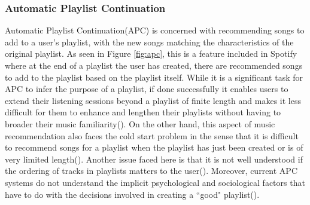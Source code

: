 \documentclass{l4proj}
\begin{document}
\subsubsection{Automatic Playlist Continuation} Automatic Playlist Continuation(APC) is concerned with recommending songs to add to a user's playlist, with the new songs matching the characteristics of the original playlist. As seen in Figure \ref{fig:apc}, this is a feature included in Spotify where at the end of a playlist the user has created, there are recommended songs to add to the playlist based on the playlist itself. While it is a significant task for APC to infer the purpose of a playlist, if done successfully it enables users to extend their listening sessions beyond a playlist of finite length and makes it less difficult for them to enhance and lengthen their playlists without having to broader their music familiarity(\cite{Schedl_Zamani_Chen_Deldjoo_Elahi_2018}). On the other hand, this aspect of music recommendation also faces the cold start problem in the sense that it is difficult to recommend songs for a playlist when the playlist has just been created or is of very limited length(\cite{Schedl_Zamani_Chen_Deldjoo_Elahi_2018}). Another issue faced here is that it is not well understood if the ordering of tracks in playlists matters to the user(\cite{Schedl_Zamani_Chen_Deldjoo_Elahi_2018}). Moreover, current APC systems do not understand the implicit psychological and sociological factors that have to do with the decisions involved in creating a ``good" playlist(\cite{Schedl_Zamani_Chen_Deldjoo_Elahi_2018}).
\end{document}
